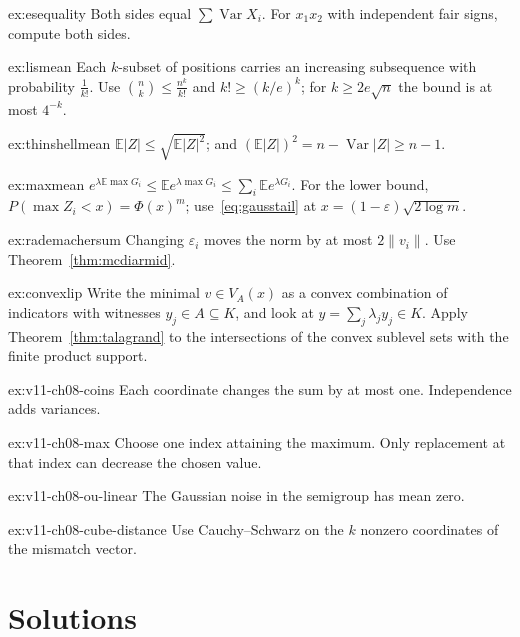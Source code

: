 \begin{hint}{ex:esequality}
Both sides equal $\sum\operatorname{Var}X_i$. For $x_1x_2$ with independent fair signs, compute both sides.
\end{hint}
\begin{hint}{ex:lismean}
Each $k$-subset of positions carries an increasing subsequence with probability $\frac1{k!}$. Use $\binom nk\le\frac{n^k}{k!}$ and $k!\ge(k/e)^k$; for $k\ge2e\sqrt n$ the bound is at most $4^{-k}$.
\end{hint}
\begin{hint}{ex:thinshellmean}
$\mathbb E|Z|\le\sqrt{\mathbb E|Z|^2}$; and $(\mathbb E|Z|)^2=n-\operatorname{Var}|Z|\ge n-1$.
\end{hint}
\begin{hint}{ex:maxmean}
$e^{\lambda\mathbb E\max G_i}\le\mathbb Ee^{\lambda\max G_i}\le\sum_i\mathbb Ee^{\lambda G_i}$. For the lower bound, $P(\max Z_i<x)=\Phi(x)^m$; use~\eqref{eq:gausstail} at $x=(1-\varepsilon)\sqrt{2\log m}$.
\end{hint}
\begin{hint}{ex:rademachersum}
Changing $\varepsilon_i$ moves the norm by at most $2\|v_i\|$. Use Theorem~\ref{thm:mcdiarmid}.
\end{hint}
\begin{hint}{ex:convexlip}
Write the minimal $v\in V_A(x)$ as a convex combination of indicators with witnesses $y_j\in A\subseteq K$, and look at $y=\sum_j\lambda_jy_j\in K$. Apply Theorem~\ref{thm:talagrand} to the intersections of the convex sublevel sets with the finite product support.
\end{hint}

\begin{hint}{ex:v11-ch08-coins}
Each coordinate changes the sum by at most one. Independence adds variances.
\end{hint}
\begin{hint}{ex:v11-ch08-max}
Choose one index attaining the maximum. Only replacement at that index can decrease the chosen value.
\end{hint}
\begin{hint}{ex:v11-ch08-ou-linear}
The Gaussian noise in the semigroup has mean zero.
\end{hint}
\begin{hint}{ex:v11-ch08-cube-distance}
Use Cauchy--Schwarz on the $k$ nonzero coordinates of the mismatch vector.
\end{hint}

\section{Solutions}

